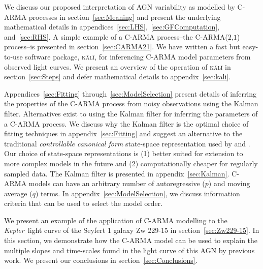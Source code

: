 \documentclass[a4paper,fleqn,usenatbib]{mnras}
\newcommand{\Kepler}{\textit{Kepler~}}
\begin{document}
We discuss our proposed interpretation of AGN variability as modelled by C-ARMA processes in section~\ref{sec:Meaning} and present the underlying mathematical details in appendices~\ref{sec:LHS},~\ref{sec:GFComputation}, and~\ref{sec:RHS}. A simple example of a C-ARMA process--the C-ARMA($2$,$1$) process--is presented in section~\ref{sec:CARMA21}. We have written a fast but easy-to-use software package, \textsc{k\={a}l\={i}}, for inferencing C-ARMA model parameters from observed light curves. We present an overview of the operation of \textsc{k\={a}l\={i}} in section~\ref{sec:Steps} and defer mathematical details to appendix~\ref{sec:kali}.

Appendices~\ref{sec:Fitting} through~\ref{sec:ModelSelection} present details of inferring the properties of the C-ARMA process from noisy observations using the Kalman filter. Alternatives exist to using the Kalman filter for inferring the parameters of a C-ARMA process. We discuss why the Kalman filter is the optimal choice of fitting techniques in appendix~\ref{sec:Fitting}
and suggest an alternative to the traditional \textit{controllable canonical form} state-space representation used by \citet{JonesAckerson90} and \citet{Brockwell14}. Our choice of state-space representations is (1) better suited for extension to more complex models in the future and (2) computationally cheaper for regularly sampled data. The Kalman filter is presented in appendix~\ref{sec:Kalman}. C-ARMA models can have an arbitrary number of autoregressive ($p$) and moving average ($q$) terms. In appendix~\ref{sec:ModelSelection}, we discuss information criteria that can be used to select the model order.

We present an example of the application of C-ARMA modelling to the \Kepler light curve of the Seyfert 1 galaxy Zw 229-15 in section~\ref{sec:Zw229-15}. In this section, we demonstrate how the C-ARMA model can be used to explain the multiple slopes and time-scales found in the light curve of this AGN by previous work. We present our conclusions in section~\ref{sec:Conclusions}.
\end{document}
